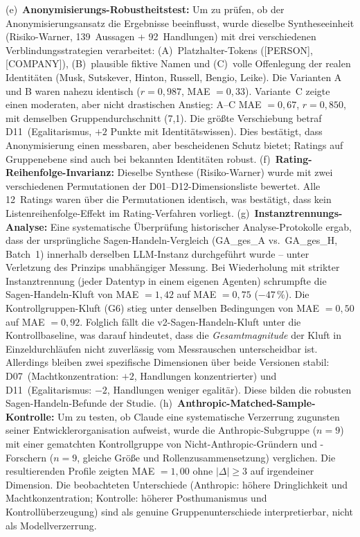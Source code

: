 \documentclass[12pt,a4paper]{article}
\begin{document}
(e)~\textbf{Anonymisierungs-Robustheitstest:} Um zu prüfen, ob der Anonymisierungsansatz die Ergebnisse beeinflusst, wurde dieselbe Syntheseeinheit (Risiko-Warner, 139~Aussagen + 92~Handlungen) mit drei verschiedenen Verblindungsstrategien verarbeitet: (A)~Platzhalter-Tokens ([PERSON], [COMPANY]), (B)~plausible fiktive Namen und (C)~volle Offenlegung der realen Identitäten (Musk, Sutskever, Hinton, Russell, Bengio, Leike). Die Varianten A und B waren nahezu identisch ($r = 0{,}987$, MAE $= 0{,}33$). Variante~C zeigte einen moderaten, aber nicht drastischen Anstieg: A--C MAE $= 0{,}67$, $r = 0{,}850$, mit demselben Gruppendurchschnitt (7,1). Die größte Verschiebung betraf D11~(Egalitarismus, $+2$ Punkte mit Identitätswissen). Dies bestätigt, dass Anonymisierung einen messbaren, aber bescheidenen Schutz bietet; Ratings auf Gruppenebene sind auch bei bekannten Identitäten robust.
(f)~\textbf{Rating-Reihenfolge-Invarianz:} Dieselbe Synthese (Risiko-Warner) wurde mit zwei verschiedenen Permutationen der D01--D12-Dimensionsliste bewertet. Alle 12~Ratings waren über die Permutationen identisch, was bestätigt, dass kein Listenreihenfolge-Effekt im Rating-Verfahren vorliegt.
(g)~\textbf{Instanztrennungs-Analyse:} Eine systematische Überprüfung historischer Analyse-Protokolle ergab, dass der ursprüngliche Sagen-Handeln-Vergleich (GA\_ges\_A vs.\ GA\_ges\_H, Batch~1) innerhalb derselben LLM-Instanz durchgeführt wurde -- unter Verletzung des Prinzips unabhängiger Messung. Bei Wiederholung mit strikter Instanztrennung (jeder Datentyp in einem eigenen Agenten) schrumpfte die Sagen-Handeln-Kluft von MAE $= 1{,}42$ auf MAE $= 0{,}75$ ($-47\,\%$). Die Kontrollgruppen-Kluft (G6) stieg unter denselben Bedingungen von MAE $= 0{,}50$ auf MAE $= 0{,}92$. Folglich fällt die v2-Sagen-Handeln-Kluft unter die Kontrollbaseline, was darauf hindeutet, dass die \emph{Gesamtmagnitude} der Kluft in Einzeldurchläufen nicht zuverlässig vom Messrauschen unterscheidbar ist. Allerdings bleiben zwei spezifische Dimensionen über beide Versionen stabil: D07~(Machtkonzentration: $+2$, Handlungen konzentrierter) und D11~(Egalitarismus: $-2$, Handlungen weniger egalitär). Diese bilden die robusten Sagen-Handeln-Befunde der Studie.
(h)~\textbf{Anthropic-Matched-Sample-Kontrolle:} Um zu testen, ob Claude eine systematische Verzerrung zugunsten seiner Entwicklerorganisation aufweist, wurde die Anthropic-Subgruppe ($n = 9$) mit einer gematchten Kontrollgruppe von Nicht-Anthropic-Gründern und -Forschern ($n = 9$, gleiche Größe und Rollenzusammensetzung) verglichen. Die resultierenden Profile zeigten MAE $= 1{,}00$ ohne $|\Delta| \geq 3$ auf irgendeiner Dimension. Die beobachteten Unterschiede (Anthropic: höhere Dringlichkeit und Machtkonzentration; Kontrolle: höherer Posthumanismus und Kontrollüberzeugung) sind als genuine Gruppenunterschiede interpretierbar, nicht als Modellverzerrung.
\end{document}
